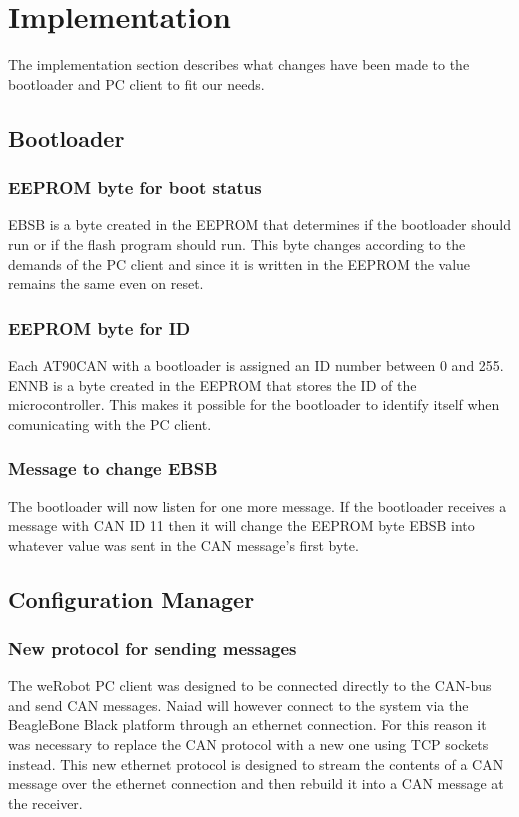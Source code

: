 \section{Implementation}\label{sec:implementation}
The implementation section describes what changes have been made to the bootloader and PC client to fit our needs.




\subsection{Bootloader}
\subsubsection{EEPROM byte for boot status}
EBSB is a byte created in the EEPROM that determines if the bootloader should run or if the flash program should run. This byte changes according to the demands of the PC client and since it is written in the EEPROM the value remains the same even on reset.

\subsubsection{EEPROM byte for ID}
Each AT90CAN with a bootloader is assigned an ID number between 0 and 255. ENNB is a byte created in the EEPROM that stores the ID of the microcontroller. This makes it possible for the bootloader to identify itself when comunicating with the PC client.

\subsubsection{Message to change EBSB}
The bootloader will now listen for one more message. If the bootloader receives a message with CAN ID 11 then it will change the EEPROM byte EBSB into whatever value was sent in the CAN message's first byte.

\subsection{Configuration Manager}

\subsubsection{New protocol for sending messages}
The weRobot PC client was designed to be connected directly to the CAN-bus and send CAN messages. Naiad will however connect to the system via the BeagleBone Black platform through an ethernet connection. For this reason it was necessary to replace the CAN protocol with a new one using TCP sockets instead. This new ethernet protocol is designed to stream the contents of a CAN message over the ethernet connection and then rebuild it into a CAN message at the receiver.

